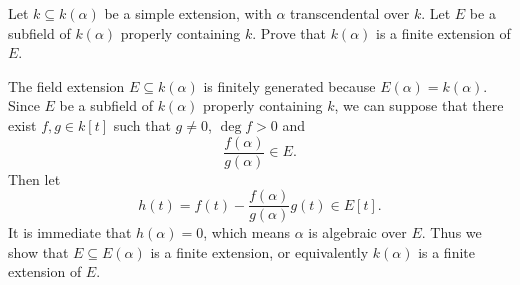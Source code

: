 \begin{problem}[1.4]
Let $k \subseteq k(\alpha)$ be a simple extension, with $\alpha$ transcendental over $k$. Let $E$ be a subfield of $k(\alpha)$ properly containing $k$. Prove that $k(\alpha)$ is a finite extension of $E$.
\end{problem}
\begin{solution}
The field extension $E\subseteq k(\alpha)$ is finitely generated because  $E(\alpha)= k(\alpha)$. Since $E$ be a subfield of $k(\alpha)$ properly containing $k$, we can suppose that there exist $f,g\in k[t]$ such that $g\ne0$, $\deg f>0$ and
\[
\frac{f(\alpha)}{g(\alpha)}\in E.
\]
Then let
\[
h(t)=f(t)-\frac{f(\alpha)}{g(\alpha)}g(t)\in E[t].
\]
It is immediate that $h(\alpha)=0$, which means $\alpha$ is algebraic over $E$. Thus we show that $E\subseteq E(\alpha)$ is a finite extension, or equivalently $k(\alpha)$ is a finite extension of $E$.
\end{solution}

